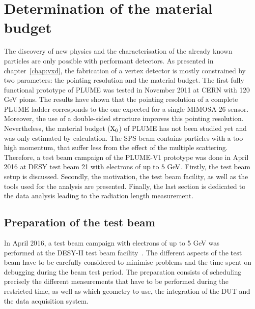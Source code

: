 \chapter{Determination of the material budget}
\label{chap:X0}

  The discovery of new physics and the characterisation of the already known particles are only possible with performant detectors.
  As presented in chapter~\ref{chap:vxd}, the fabrication of a vertex detector is mostly constrained by two parameters: the pointing resolution and the material budget.
  The first fully functional prototype of \gls{PLUME} was tested in November 2011 at CERN with 120 GeV pions.
  The results have shown that the pointing resolution of a complete \gls{PLUME} ladder corresponds to the one expected for a single \gls{MIMOSA}-26 sensor.
  Moreover, the use of a double-sided structure improves this pointing resolution. 
  Nevertheless, the material budget ($\rm{X_0}$) of \gls{PLUME} has not been studied yet and was only estimated by calculation.
  The \gls{SPS} beam contains particles with a too high momentum, that suffer less from the effect of the multiple scattering.
  Therefore, a test beam campaign of the PLUME-V1 prototype was done in April 2016 at DESY test beam 21 with electrons of up to $5~\rm{GeV}$.
  Firstly, the test beam setup is discussed.
  Secondly, the motivation, the test beam facility, as well as the tools used for the analysis are presented.
  Finally, the last section is dedicated to the data analysis leading to the radiation length measurement.

\minitoc

  \section{Preparation of the test beam}

  In April 2016, a test beam campaign with electrons of up to 5 GeV was performed at the DESY-II test beam facility~\cite{DESYII}.
  The different aspects of the test beam have to be carefully considered to minimise problems and the time spent on debugging during the beam test period.
  The preparation consists of scheduling precisely the different measurements that have to be performed during the restricted time, as well as which geometry to use, the integration of the \gls{DUT} and the data acquisition system.
  
